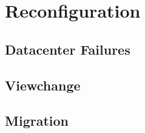 \section{Reconfiguration}
\subsection{Datacenter Failures}

\subsection{Viewchange}

\subsection{Migration}



